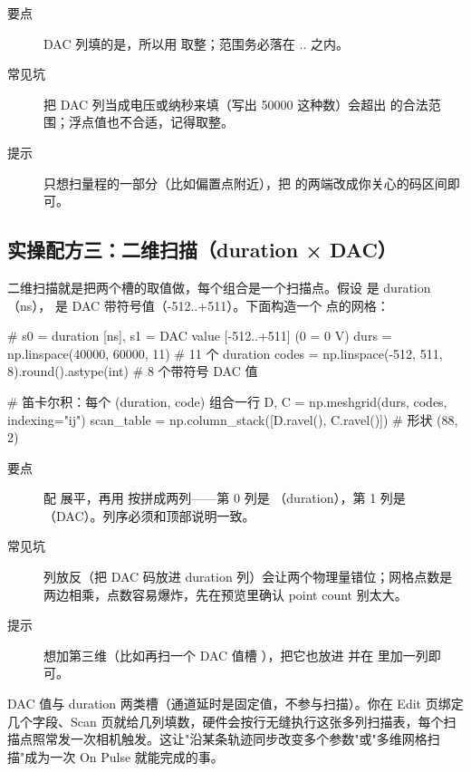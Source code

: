 \documentclass[11pt,oneside,openany]{book}
\begin{document}
\begin{description}
\item[要点] DAC 列填的是，所以用  取整；范围务必落在 .. 之内。
\item[常见坑] 把 DAC 列当成电压或纳秒来填（写出 50000 这种数）会超出  的合法范围；浮点值也不合适，记得取整。
\item[提示] 只想扫量程的一部分（比如偏置点附近），把  的两端改成你关心的码区间即可。
\end{description}

\subsection{实操配方三：二维扫描（duration × DAC）}

二维扫描就是把两个槽的取值做，每个组合是一个扫描点。假设  是 duration（ns）， 是 DAC 带符号值（-512..+511）。下面构造一个  点的网格：

\begin{codeblock}[Python]
# s0 = duration [ns], s1 = DAC value [-512..+511] (0 = 0 V)
durs  = np.linspace(40000, 60000, 11)        # 11 个 duration
codes = np.linspace(-512, 511, 8).round().astype(int)  # 8 个带符号 DAC 值

# 笛卡尔积：每个 (duration, code) 组合一行
D, C = np.meshgrid(durs, codes, indexing="ij")
scan_table = np.column_stack([D.ravel(), C.ravel()])  # 形状 (88, 2)
\end{codeblock}

\begin{description}
\item[要点]  配  展平，再用  按拼成两列——第 0 列是 （duration），第 1 列是 （DAC）。列序必须和顶部说明一致。
\item[常见坑] 列放反（把 DAC 码放进 duration 列）会让两个物理量错位；网格点数是两边相乘，点数容易爆炸，先在预览里确认 point count 别太大。
\item[提示] 想加第三维（比如再扫一个 DAC 值槽 ），把它也放进  并在  里加一列即可。
\end{description}

\begin{notebox}[同时扫多个物理量]
DAC 值与 duration 两类槽（通道延时是固定值，不参与扫描）。你在 Edit 页绑定几个字段、Scan 页就给几列填数，硬件会按行无缝执行这张多列扫描表，每个扫描点照常发一次相机触发。这让"沿某条轨迹同步改变多个参数"或"多维网格扫描"成为一次 On Pulse 就能完成的事。
\end{notebox}
\end{document}
